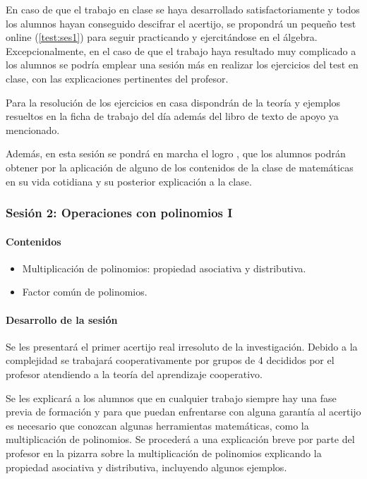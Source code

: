 En caso de que el trabajo en clase se haya desarrollado satisfactoriamente y todos los alumnos hayan conseguido descifrar el acertijo, se propondrá un pequeño test online (\ref{test:ses1}) para seguir practicando y ejercitándose en el álgebra.
%
Excepcionalmente, en el caso de que el trabajo haya resultado muy complicado a los alumnos se podría emplear una sesión más en realizar los ejercicios del test en clase, con las explicaciones pertinentes del profesor.

Para la resolución de los ejercicios en casa dispondrán de la teoría y ejemplos resueltos en la ficha de trabajo del día además del libro de texto de apoyo ya mencionado.

Además, en esta sesión se pondrá en marcha el logro , que los alumnos podrán obtener por la aplicación de alguno de los contenidos de la clase de matemáticas en su vida cotidiana y su posterior explicación a la clase.


\subsubsection{Sesión 2: Operaciones con polinomios I}

\paragraph{Contenidos}
\begin{itemize}
	\item Multiplicación de polinomios: propiedad asociativa y distributiva.
	\item Factor común de polinomios.
\end{itemize}

\paragraph{Desarrollo de la sesión}

Se les presentará el primer acertijo real irresoluto de la investigación.
%
Debido a la complejidad se trabajará cooperativamente por grupos de 4 decididos por el profesor atendiendo a la teoría del aprendizaje cooperativo. 

Se les explicará a los alumnos que en cualquier trabajo siempre hay una fase previa de formación y para que puedan enfrentarse con alguna garantía al acertijo es necesario que conozcan algunas herramientas matemáticas, como la multiplicación de polinomios.
%
Se procederá a una explicación breve por parte del profesor en la pizarra sobre la multiplicación de polinomios explicando la propiedad asociativa y distributiva, incluyendo algunos ejemplos.

